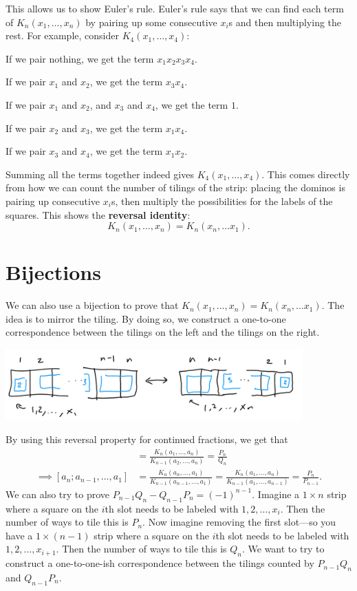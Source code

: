 \documentclass[11pt,paper=letter]{scrartcl}
\begin{document}
This allows us to show Euler's rule. Euler's rule says that we can find each term of $K_n(x_1, \ldots, x_n)$ by pairing up some consecutive $x_i$s and then multiplying the rest. For example, consider $K_4(x_1, \ldots, x_4)$:
\begin{itemthin}
\item If we pair nothing, we get the term $x_1x_2x_3x_4$.
\item If we pair $x_1$ and $x_2$, we get the term $x_3x_4$.
\item If we pair $x_1$ and $x_2$, and $x_3$ and $x_4$, we get the term $1$.
\item If we pair $x_2$ and $x_3$, we get the term $x_1x_4$.
\item If we pair $x_3$ and $x_4$, we get the term $x_1x_2$.
\end{itemthin}
Summing all the terms together indeed gives $K_4(x_1, \ldots, x_4)$. This comes directly from how we can count the number of tilings of the strip: placing the dominos is pairing up consecutive $x_i$s, then multiply the possibilities for the labels of the squares. This shows the \textbf{reversal identity}: \[
  K_n(x_1, \ldots, x_n) = K_n(x_n, \ldots x_1).
\]

\section{Bijections}

We can also use a bijection to prove that $K_n(x_1, \ldots, x_n) = K_n(x_n, \ldots x_1)$. The idea is to mirror the tiling. By doing so, we construct a one-to-one correspondence between the tilings on the left and the tilings on the right.

\begin{center}
\includegraphics[width=4.5in]{3.png}
\end{center}

By using this reversal property for continued fractions, we get that
\begin{align*}
[a_1; a_2, \ldots, a_n] &=
\frac{K_n(a_1, \ldots, a_n)}{K_{n-1}(a_2, \ldots, a_n)} =
\frac{P_n}{Q_n} \\
\implies [a_n; a_{n-1}, \ldots, a_1] &=
\frac{K_n(a_n, \ldots, a_1)}{K_{n-1}(a_{n-1}, \ldots, a_1)} =
\frac{K_n(a_1, \ldots, a_n)}{K_{n-1}(a_1, \ldots, a_{n-1})}
= \frac{P_n}{P_{n-1}}.
\end{align*}
We can also try to prove $P_{n-1}Q_n - Q_{n-1}P_n = (-1)^{n-1}.$ Imagine a $1 \times n$ strip where a square on the $i$th slot needs to be labeled with $1, 2, \ldots, x_i$. Then the number of ways to tile this is $P_n$. Now imagine removing the first slot---so you have a $1 \times (n-1)$ strip where a square on the $i$th slot needs to be labeled with $1, 2, \ldots, x_{i+1}$. Then the number of ways to tile this is $Q_n$. We want to try to construct a one-to-one-ish correspondence between the tilings counted by $P_{n-1}Q_n$ and $Q_{n-1}P_n$.
\end{document}
